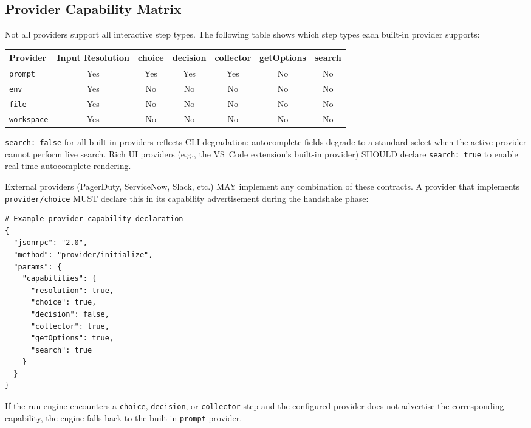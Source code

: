\subsection{Provider Capability Matrix}
\label{subsec:provider-capability-matrix}

Not all providers support all interactive step types.  The following table
shows which step types each built-in provider supports:

\begin{center}
\begin{tabular}{|l|c|c|c|c|c|c|}
\hline
\textbf{Provider} & \textbf{Input Resolution} & \textbf{choice} & \textbf{decision} & \textbf{collector} & \textbf{getOptions} & \textbf{search} \\
\hline
\texttt{prompt}   & Yes & Yes & Yes & Yes & No  & No  \\
\texttt{env}      & Yes & No  & No  & No  & No  & No  \\
\texttt{file}     & Yes & No  & No  & No  & No  & No  \\
\texttt{workspace}& Yes & No  & No  & No  & No  & No  \\
\hline
\end{tabular}
\end{center}

\noindent
\texttt{search: false} for all built-in providers reflects CLI degradation: autocomplete
fields degrade to a standard select when the active provider cannot perform live search.
Rich UI providers (e.g., the VS~Code extension's built-in provider) SHOULD declare
\texttt{search: true} to enable real-time autocomplete rendering.

External providers (PagerDuty, ServiceNow, Slack, etc.) MAY implement any
combination of these contracts.  A provider that implements
\texttt{provider/choice} MUST declare this in its capability advertisement
during the handshake phase:

\begin{verbatim}
# Example provider capability declaration
{
  "jsonrpc": "2.0",
  "method": "provider/initialize",
  "params": {
    "capabilities": {
      "resolution": true,
      "choice": true,
      "decision": false,
      "collector": true,
      "getOptions": true,
      "search": true
    }
  }
}
\end{verbatim}

If the run engine encounters a \texttt{choice}, \texttt{decision}, or
\texttt{collector} step and the configured provider does not advertise the
corresponding capability, the engine falls back to the built-in \texttt{prompt}
provider.


